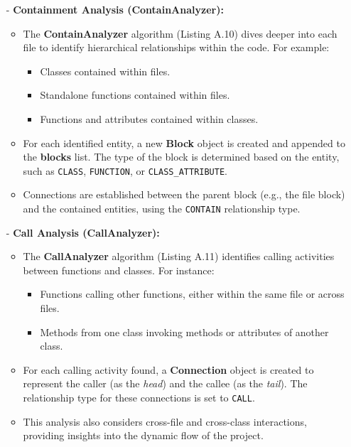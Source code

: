\begin{itemize}
    \item[-] \textbf{Containment Analysis (ContainAnalyzer):}
    \begin{itemize}
        \item The \textbf{ContainAnalyzer} algorithm (Listing A.10) dives deeper into each file to identify hierarchical relationships within the code. For example:
        \begin{itemize}
            \item Classes contained within files.
            \item Standalone functions contained within files.
            \item Functions and attributes contained within classes.
        \end{itemize}
        \item For each identified entity, a new \textbf{Block} object is created and appended to the \textbf{blocks} list. The type of the block is determined based on the entity, such as \texttt{CLASS}, \texttt{FUNCTION}, or \texttt{CLASS\_ATTRIBUTE}.
        \item Connections are established between the parent block (e.g., the file block) and the contained entities, using the \texttt{CONTAIN} relationship type.
    \end{itemize}

    \item[-] \textbf{Call Analysis (CallAnalyzer):}
    \begin{itemize}
        \item The \textbf{CallAnalyzer} algorithm (Listing A.11) identifies calling activities between functions and classes. For instance:
        \begin{itemize}
            \item Functions calling other functions, either within the same file or across files.
            \item Methods from one class invoking methods or attributes of another class.
        \end{itemize}
        \item For each calling activity found, a \textbf{Connection} object is created to represent the caller (as the \textit{head}) and the callee (as the \textit{tail}). The relationship type for these connections is set to \texttt{CALL}.
        \item This analysis also considers cross-file and cross-class interactions, providing insights into the dynamic flow of the project.
    \end{itemize}


\end{itemize}
